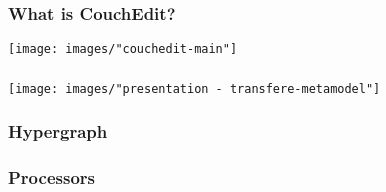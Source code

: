 \begin{frame}
  \frametitle{What is CouchEdit?}
  \hspace{-1.5cm}
  \centering
  \texttt{[image: images/"couchedit-main"]}
\end{frame}

\begin{frame}
  \frametitle{}
  \hspace{-1.5cm}
  \centering
  \texttt{[image: images/"presentation - transfere-metamodel"]}
\end{frame}


\begin{frame}
  \frametitle{Hypergraph}
  \hspace{-1cm}
  \centering
  
\end{frame}

\begin{frame}
  \frametitle{Processors}
  \hspace{-1cm}
  \centering
  
\end{frame}